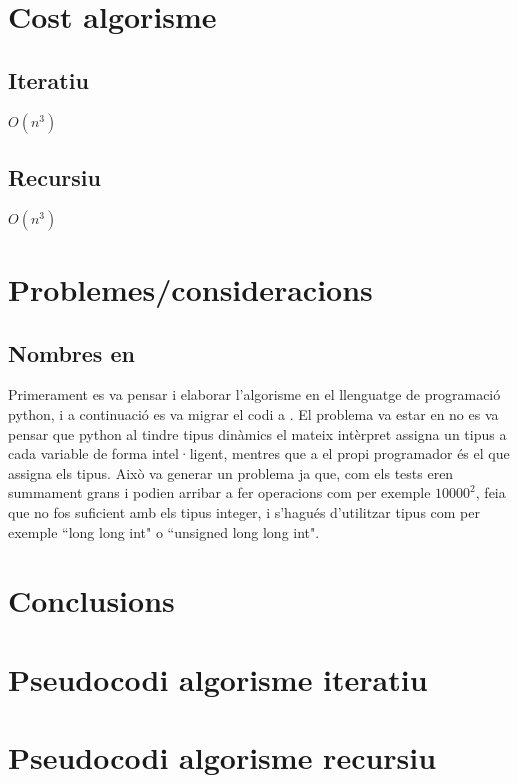 \documentclass[12pt, letterpaper]{article}
\begin{document}
\section{Cost algorisme}
\subsection{Iteratiu}
$O(n^{3})$ 
\subsection{Recursiu}
$O(n^{3})$ 
    
\section{Problemes/consideracions}
\subsection{Nombres en \cpluspluslogo}
Primerament es va pensar i elaborar l'algorisme en el llenguatge de programació python, i a continuació es va migrar el codi a \cpluspluslogo. El problema va estar en no es va pensar que python al tindre tipus dinàmics el mateix intèrpret assigna un tipus a cada variable de forma intel·ligent, mentres que a \cpluspluslogo el propi programador és el que assigna els tipus. Això va generar un problema ja que, com els tests eren summament grans i podien arribar a fer operacions com per exemple $10000^{2}$, feia que no fos suficient amb els tipus integer, i s'hagués d'utilitzar tipus com per exemple ``long long int" o ``unsigned long long int".

\section{Conclusions}

\appendix
\section{Pseudocodi algorisme iteratiu}
\label{pseudocodiiteratiu}

\section{Pseudocodi algorisme recursiu}
\label{pseudocodirecursiu}
\end{document}
